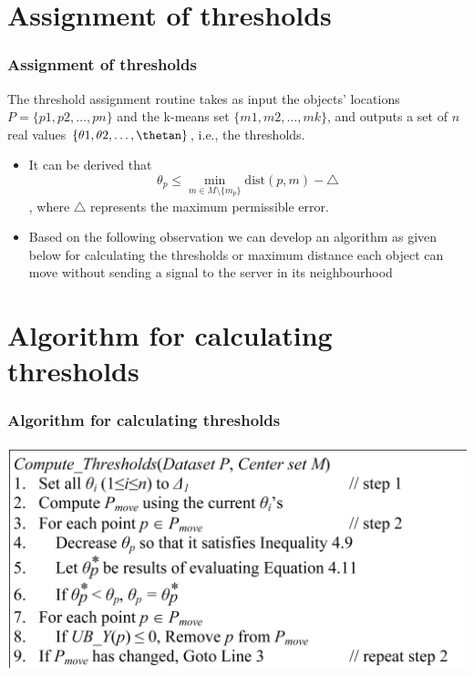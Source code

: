 \documentclass{beamer}
\begin{document}
\section{Assignment of thresholds}
\begin{frame}
\frametitle{Assignment of thresholds}
The threshold assignment routine takes as input the
objects’ locations \(P = \{p1, p2, \ldots, pn\}\) and the k-means set
\(\{m1, m2, \ldots, mk\}\), and outputs a set of \(n\) real values \(\{\theta1, \theta2, \ldots, \thetan\}\), i.e., the thresholds.
\begin{itemize}
    \item It can be derived that \[ \theta_p \leq \min_{m \in M \setminus \{m_p\}} \text{dist}(p, m) - \triangle \], where $\triangle$ represents the maximum permissible error.
    \vspace{5mm}
    \item  Based on the following observation we can develop an algorithm as given below for calculating the thresholds or maximum distance each object can move without sending a signal to the server in its neighbourhood
\end{itemize}


\end{frame}


\section{Algorithm for calculating thresholds}
\begin{frame}
\frametitle{Algorithm for calculating thresholds}


    \begin{center}
        \includegraphics[width=\textwidth]{algo.png} %
        
    \end{center}
\end{frame}
\end{document}
